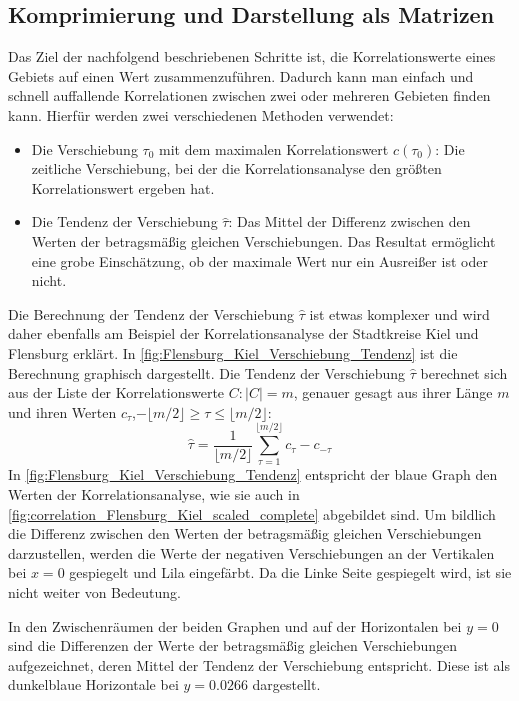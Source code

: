 \subsection{Komprimierung und Darstellung als Matrizen}\label{sec:Grundlagen:Korrelation:Komprimierung}
Das Ziel der nachfolgend beschriebenen Schritte ist, die Korrelationswerte eines Gebiets auf einen Wert zusammenzuführen. Dadurch kann man einfach und schnell auffallende Korrelationen zwischen zwei oder mehreren Gebieten finden kann.
Hierfür werden zwei verschiedenen Methoden verwendet:
\begin{itemize}
    \item Die Verschiebung $\tau_0$ mit dem maximalen Korrelationswert $c(\tau_0)$: Die zeitliche Verschiebung, bei der die Korrelationsanalyse den größten Korrelationswert ergeben hat.
    \item Die Tendenz der Verschiebung $\hat{\tau}$: 
    Das Mittel der Differenz zwischen den Werten der betragsmäßig gleichen Verschiebungen.
    Das Resultat ermöglicht eine grobe Einschätzung, ob der maximale Wert nur ein Ausreißer ist oder nicht.
\end{itemize}

Die Berechnung der Tendenz der Verschiebung $\hat{\tau}$ ist etwas komplexer und wird daher ebenfalls am Beispiel der Korrelationsanalyse der Stadtkreise Kiel und Flensburg erklärt.
In \autoref{fig:Flensburg_Kiel_Verschiebung_Tendenz} ist die Berechnung graphisch dargestellt.
Die Tendenz der Verschiebung $\hat{\tau}$ berechnet sich aus der Liste der Korrelationswerte $C:\vert C\vert =m$, genauer gesagt aus ihrer Länge $m$ und ihren Werten $c_\tau$,$ -\lfloor m/2 \rfloor\geq \tau\leq \lfloor m/2 \rfloor$:
\begin{equation}\label{eq:Tendenz der Verschiebung}
    \hat{\tau} = \frac{1}{\lfloor m/2 \rfloor}
    \sum_{\tau=1}^{\lfloor m/2 \rfloor}c_{\tau}-c_{-\tau}
\end{equation}
In \autoref{fig:Flensburg_Kiel_Verschiebung_Tendenz} entspricht der blaue Graph den Werten der Korrelationsanalyse, wie sie auch in \autoref{fig:correlation_Flensburg_Kiel_scaled_complete} abgebildet sind. Um bildlich die Differenz zwischen den Werten der betragsmäßig gleichen Verschiebungen darzustellen, werden die Werte der negativen Verschiebungen an der Vertikalen bei $x=0$ gespiegelt und Lila eingefärbt.
Da die Linke Seite gespiegelt wird, ist sie nicht weiter von Bedeutung.

In den Zwischenräumen der beiden Graphen und auf der Horizontalen bei $y=0$ sind die Differenzen der Werte der betragsmäßig gleichen Verschiebungen aufgezeichnet, deren Mittel der Tendenz der Verschiebung entspricht. Diese ist als dunkelblaue Horizontale bei $y=0.0266$ dargestellt.

